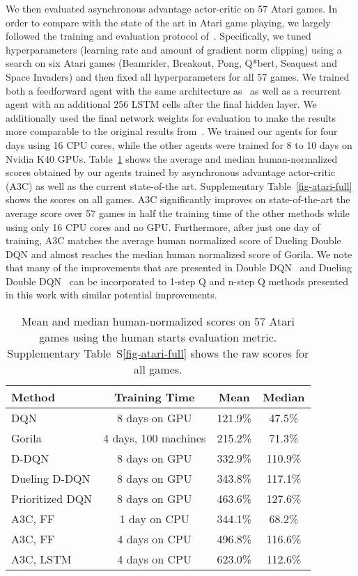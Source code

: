 \documentclass{article} \usepackage{times}
\begin{document}
We then evaluated asynchronous advantage actor-critic on 57 Atari games.
In order to compare with the state of the art in Atari game playing, we largely followed the training
and evaluation protocol of~\cite{hado2015doubledqn}.
Specifically, we tuned hyperparameters (learning rate and amount of gradient norm clipping) using a search on six Atari games (Beamrider, Breakout, Pong, Q*bert, Seaquest and Space Invaders) and then fixed all hyperparameters for all 57 games.
We trained both a feedforward agent with the same architecture as~\citep{mnih-dqn-2015,nair2015gorila,hado2015doubledqn} as well as a recurrent agent with an additional 256 LSTM cells after the final hidden layer.
We additionally used the final network weights for evaluation to make the results more comparable to the original results from~\cite{bellemare-ale}.
We trained our agents for four days using 16 CPU cores, while the other agents were trained for 8 to 10 days on Nvidia K40 GPUs.
Table~\ref{fig-atari-stats} shows the average and median human-normalized scores obtained by our agents trained by asynchronous advantage actor-critic (A3C) as well as
the current state-of-the art. Supplementary Table~\ref{fig-atari-full} shows the scores on all games.
A3C significantly improves on state-of-the-art the average score over 57 games
in half the training time of the other methods while using only 16 CPU cores and no GPU.
Furthermore, after just one day of training, A3C matches the average human normalized score of Dueling Double DQN and almost reaches the median human normalized score of Gorila. We note that many of the improvements that are presented in Double DQN~\citep{hado2015doubledqn} and Dueling Double DQN~\citep{wang2015dueling} can be incorporated to 1-step Q and n-step Q methods presented in this work with similar potential improvements.

\begin{table}
\small
\begin{center}
\begin{tabular}{ | l | c | c | c | }
\hline
Method & Training Time & Mean & Median \\
\hline\hline
DQN & 8 days on GPU & 121.9\% & 47.5\% \\
Gorila & 4 days, 100 machines & 215.2\% & 71.3\% \\
D-DQN & 8 days on GPU & 332.9\% & 110.9\% \\
Dueling D-DQN & 8 days on GPU & 343.8\% & 117.1\% \\
Prioritized DQN & 8 days on GPU & 463.6\% & 127.6\% \\
A3C, FF & 1 day on CPU & 344.1\% & 68.2\% \\
A3C, FF & 4 days on CPU & 496.8\% & 116.6\% \\
A3C, LSTM & 4 days on CPU & 623.0\% & 112.6\% \\
 \hline
\end{tabular}
\caption{\label{fig-atari-stats}
    Mean and median human-normalized scores on 57 Atari games using the human starts evaluation metric.  Supplementary Table~S\ref{fig-atari-full} shows the raw scores for all games.
}
\end{center}
\vspace{-0.45cm}
\end{table}
\end{document}
